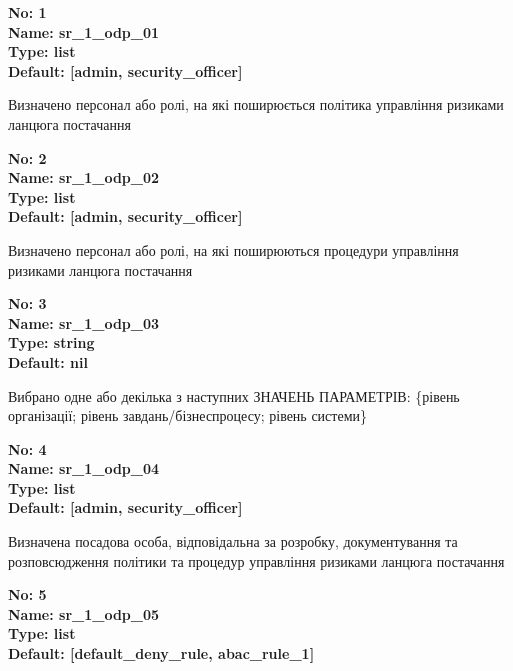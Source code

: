 \documentclass{article}
\begin{document}
\vspace{10pt}
{\footnotesize\bfseries
No: 1\\
Name: sr\_\allowbreak{}1\_\allowbreak{}odp\_\allowbreak{}01\\
Type: list\\
Default: [\textquotedbl{}admin\textquotedbl{}, \textquotedbl{}security\_\allowbreak{}officer\textquotedbl{}]
}

{\footnotesize Визначено персонал або ролі, на які поширюється політика управління ризиками ланцюга постачання}


{\footnotesize\bfseries
No: 2\\
Name: sr\_\allowbreak{}1\_\allowbreak{}odp\_\allowbreak{}02\\
Type: list\\
Default: [\textquotedbl{}admin\textquotedbl{}, \textquotedbl{}security\_\allowbreak{}officer\textquotedbl{}]
}

{\footnotesize Визначено персонал або ролі, на які поширюються процедури управління ризиками ланцюга постачання}


{\footnotesize\bfseries
No: 3\\
Name: sr\_\allowbreak{}1\_\allowbreak{}odp\_\allowbreak{}03\\
Type: string\\
Default: nil
}

{\footnotesize Вибрано одне або декілька з наступних ЗНАЧЕНЬ ПАРАМЕТРІВ: \{рівень організації; рівень завдань/бізнеспроцесу; рівень системи\}}


{\footnotesize\bfseries
No: 4\\
Name: sr\_\allowbreak{}1\_\allowbreak{}odp\_\allowbreak{}04\\
Type: list\\
Default: [\textquotedbl{}admin\textquotedbl{}, \textquotedbl{}security\_\allowbreak{}officer\textquotedbl{}]
}

{\footnotesize Визначена посадова особа, відповідальна за розробку, документування та розповсюдження політики та процедур управління ризиками ланцюга постачання}


{\footnotesize\bfseries
No: 5\\
Name: sr\_\allowbreak{}1\_\allowbreak{}odp\_\allowbreak{}05\\
Type: list\\
Default: [\textquotedbl{}default\_\allowbreak{}deny\_\allowbreak{}rule\textquotedbl{}, \textquotedbl{}abac\_\allowbreak{}rule\_\allowbreak{}1\textquotedbl{}]
}
\end{document}
